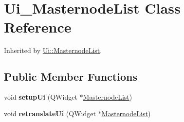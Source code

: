 \hypertarget{class_ui___masternode_list}{}\section{Ui\+\_\+\+Masternode\+List Class Reference}
\label{class_ui___masternode_list}


Inherited by \mbox{\hyperlink{class_ui_1_1_masternode_list}{Ui\+::\+Masternode\+List}}.

\subsection*{Public Member Functions}
\begin{DoxyCompactItemize}
\item 
\mbox{\label{class_ui___masternode_list_af924bd9604e6eb79a09f0205150ec4dc}} 
void {\bfseries setup\+Ui} (Q\+Widget $\ast$\mbox{\hyperlink{class_masternode_list}{Masternode\+List}})
\item 
\mbox{\label{class_ui___masternode_list_a199c1b898e955b5e82f56033f1595cdb}} 
void {\bfseries retranslate\+Ui} (Q\+Widget $\ast$\mbox{\hyperlink{class_masternode_list}{Masternode\+List}})
\end{DoxyCompactItemize}
